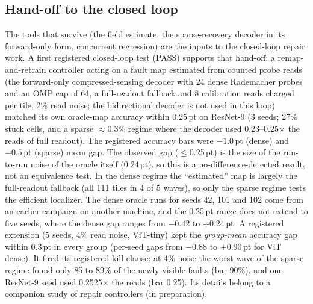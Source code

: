 \documentclass[journal]{IEEEtran}
\begin{document}
\subsection{Hand-off to the closed loop}
The tools that survive (the field estimate, the sparse-recovery decoder in its forward-only form, concurrent regression) are the inputs to the closed-loop repair work. A first registered closed-loop test (PASS) supports that hand-off: a remap-and-retrain controller acting on a fault map estimated from counted probe reads (the forward-only compressed-sensing decoder with 24 dense Rademacher probes and an OMP cap of 64, a full-readout fallback and 8 calibration reads charged per tile, 2\% read noise; the bidirectional decoder is not used in this loop) matched its own oracle-map accuracy within 0.25\,pt on ResNet-9 (3 seeds; 27\% stuck cells, and a sparse $\approx$0.3\% regime where the decoder used 0.23--0.25$\times$ the reads of full readout). The registered accuracy bars were $-1.0$\,pt (dense) and $-0.5$\,pt (sparse) mean gap. The observed gap ($\le$0.25\,pt) is the size of the run-to-run noise of the oracle itself (0.24\,pt), so this is a no-difference-detected result, not an equivalence test. In the dense regime the ``estimated'' map is largely the full-readout fallback (all 111 tiles in 4 of 5 waves), so only the sparse regime tests the efficient localizer. The dense oracle runs for seeds 42, 101 and 102 come from an earlier campaign on another machine, and the 0.25\,pt range does not extend to five seeds, where the dense gap ranges from $-0.42$ to $+0.24$\,pt.
A registered extension (5 seeds, 4\% read noise, ViT-tiny) kept the \emph{group-mean} accuracy gap within 0.3\,pt in every group (per-seed gaps from $-0.88$ to $+0.90$\,pt for ViT dense). It fired its registered kill clause: at 4\% noise the worst wave of the sparse regime found only 85 to 89\% of the newly visible faults (bar 90\%), and one ResNet-9 seed used 0.2525$\times$ the reads (bar 0.25). Its details belong to a companion study of repair controllers (in preparation).
\end{document}
